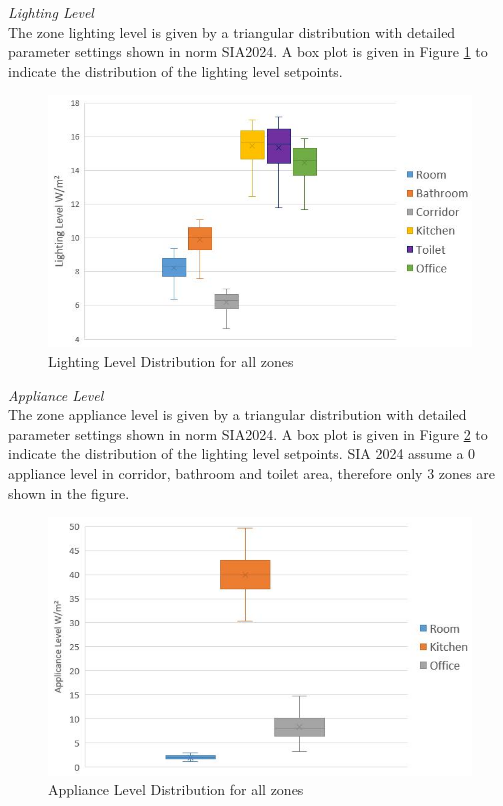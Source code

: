 \documentclass[a4paper, oneside]{discothesis}
\begin{document}
		\textit{Lighting Level}\\
			The zone lighting level is given by a triangular distribution with detailed parameter settings shown in norm SIA2024. A box plot is given in Figure \ref{fig:LightingDistribution} to indicate the distribution of the lighting level setpoints.\\

			\begin{figure}[h!]
			\centering
			\includegraphics[scale=0.7]{figures/LightingLevelDistribution.jpg}
			\caption{Lighting Level Distribution for all zones}
			\label{fig:LightingDistribution}
			\end{figure}

		\textit{Appliance Level}\\
			The zone appliance level is given by a triangular distribution with detailed parameter settings shown in norm SIA2024. A box plot is given in Figure \ref{fig:ApplianceDistribution} to indicate the distribution of the lighting level setpoints. SIA 2024 assume a 0 appliance level in corridor, bathroom and toilet area, therefore only 3 zones are shown in the figure. \\
			\begin{figure}[h!]
			\centering
			\includegraphics[scale=0.7]{figures/ApplianceLevelDistribution.jpg}
			\caption{Appliance Level Distribution for all zones}
			\label{fig:ApplianceDistribution}
			\end{figure}
\end{document}
